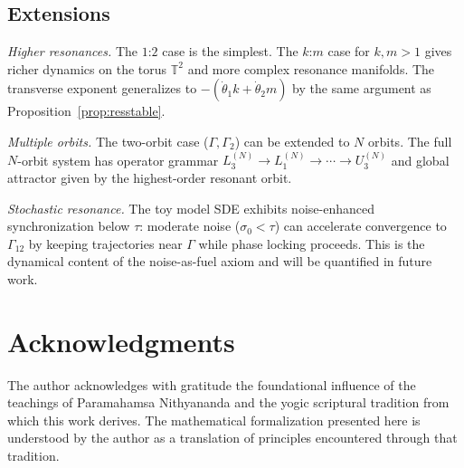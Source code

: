 \documentclass[reqno]{amsart}
\numberwithin{equation}{section}
\theoremstyle{plain}
\theoremstyle{definition}
\theoremstyle{remark}
\newcommand{\T}{\mathbb{T}}
\newcommand{\Orb}{\Gamma}
\begin{document}
\subsection{Extensions}

\emph{Higher resonances.} The $1$:$2$ case is the simplest. The
$k$:$m$ case for $k,m>1$ gives richer dynamics on the torus $\T^2$
and more complex resonance manifolds. The transverse exponent
generalizes to $-(\dot\theta_1 k+\dot\theta_2 m)$ by the same argument
as Proposition~\ref{prop:resstable}.

\emph{Multiple orbits.} The two-orbit case ($\Orb,\Orb_2$) can be
extended to $N$ orbits. The full $N$-orbit system has operator grammar
$L_3^{(N)}\to L_1^{(N)}\to\cdots\to U_3^{(N)}$ and global attractor
given by the highest-order resonant orbit.

\emph{Stochastic resonance.} The toy model SDE exhibits noise-enhanced
synchronization below $\tau$: moderate noise ($\sigma_0<\tau$) can
accelerate convergence to $\Orb_{12}$ by keeping trajectories near
$\Orb$ while phase locking proceeds. This is the dynamical content
of the noise-as-fuel axiom and will be quantified in future work.

\section*{Acknowledgments}
The author acknowledges with gratitude the foundational influence
of the teachings of Paramahamsa Nithyananda and the yogic
scriptural tradition from which this work derives. The mathematical
formalization presented here is understood by the author as a
translation of principles encountered through that tradition.
\end{document}
